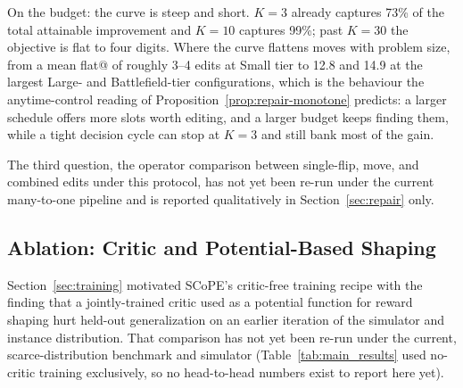 On the budget: the curve is steep and short. $K{=}3$ already captures 73\% of the total attainable improvement and $K{=}10$ captures 99\%; past $K{=}30$ the objective is flat to four digits. Where the curve flattens moves with problem size, from a mean flat@ of roughly 3--4 edits at Small tier to 12.8 and 14.9 at the largest Large- and Battlefield-tier configurations, which is the behaviour the anytime-control reading of Proposition~\ref{prop:repair-monotone} predicts: a larger schedule offers more slots worth editing, and a larger budget keeps finding them, while a tight decision cycle can stop at $K{=}3$ and still bank most of the gain.

The third question, the operator comparison between single-flip, move, and combined edits under this protocol, has not yet been re-run under the current many-to-one pipeline and is reported qualitatively in Section~\ref{sec:repair} only.

\subsection{Ablation: Critic and Potential-Based Shaping}
\label{sec:ablation}

Section~\ref{sec:training} motivated SCoPE's critic-free training recipe with the finding that a jointly-trained critic used as a potential function for reward shaping hurt held-out generalization on an earlier iteration of the simulator and instance distribution. That comparison has not yet been re-run under the current, scarce-distribution benchmark and simulator (Table~\ref{tab:main_results} used no-critic training exclusively, so no head-to-head numbers exist to report here yet).


